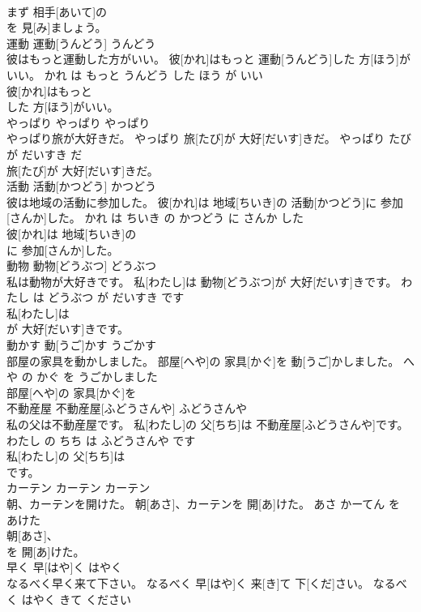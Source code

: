 \documentclass[8pt]{extreport}
\begin{document}
\begin{CJK}{UTF8}{min}
\\	まず 相手[あいて]の
\\	を 見[み]ましょう。		
\\	運動	運動[うんどう]	うんどう	
\\	彼はもっと運動した方がいい。	彼[かれ]はもっと 運動[うんどう]した 方[ほう]がいい。	かれ は もっと うんどう した ほう が いい	
\\	彼[かれ]はもっと
\\	した 方[ほう]がいい。		
\\	やっぱり	やっぱり	やっぱり	
\\	やっぱり旅が大好きだ。	やっぱり 旅[たび]が 大好[だいす]きだ。	やっぱり たび が だいすき だ	
\\	旅[たび]が 大好[だいす]きだ。		
\\	活動	活動[かつどう]	かつどう	
\\	彼は地域の活動に参加した。	彼[かれ]は 地域[ちいき]の 活動[かつどう]に 参加[さんか]した。	かれ は ちいき の かつどう に さんか した	
\\	彼[かれ]は 地域[ちいき]の
\\	に 参加[さんか]した。		
\\	動物	動物[どうぶつ]	どうぶつ	
\\	私は動物が大好きです。	私[わたし]は 動物[どうぶつ]が 大好[だいす]きです。	わたし は どうぶつ が だいすき です	
\\	私[わたし]は
\\	が 大好[だいす]きです。		
\\	動かす	動[うご]かす	うごかす	
\\	部屋の家具を動かしました。	部屋[へや]の 家具[かぐ]を 動[うご]かしました。	へや の かぐ を うごかしました	
\\	部屋[へや]の 家具[かぐ]を
\\	不動産屋	不動産屋[ふどうさんや]	ふどうさんや	
\\	私の父は不動産屋です。	私[わたし]の 父[ちち]は 不動産屋[ふどうさんや]です。	わたし の ちち は ふどうさんや です	
\\	私[わたし]の 父[ちち]は
\\	です。		
\\	カーテン	カーテン	カーテン	
\\	朝、カーテンを開けた。	朝[あさ]、カーテンを 開[あ]けた。	あさ かーてん を あけた	
\\	朝[あさ]、
\\	を 開[あ]けた。		
\\	早く	早[はや]く	はやく	
\\	なるべく早く来て下さい。	なるべく 早[はや]く 来[き]て 下[くだ]さい。	なるべく はやく きて ください	

\end{CJK}
\end{document}
